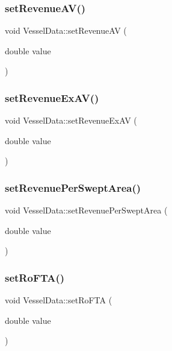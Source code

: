 \subsubsection{\texorpdfstring{setRevenueAV()}{setRevenueAV()}}
{\footnotesize\ttfamily void Vessel\+Data\+::set\+Revenue\+AV (\begin{DoxyParamCaption}\item[{double}]{value }\end{DoxyParamCaption})}

\mbox{\label{class_vessel_data_a3104c210688e4307e32b39b4f31d7a3f}} 
\subsubsection{\texorpdfstring{setRevenueExAV()}{setRevenueExAV()}}
{\footnotesize\ttfamily void Vessel\+Data\+::set\+Revenue\+Ex\+AV (\begin{DoxyParamCaption}\item[{double}]{value }\end{DoxyParamCaption})}

\mbox{\label{class_vessel_data_ad88f8d9af2a0fcedb5a27429a1dfde07}} 
\subsubsection{\texorpdfstring{setRevenuePerSweptArea()}{setRevenuePerSweptArea()}}
{\footnotesize\ttfamily void Vessel\+Data\+::set\+Revenue\+Per\+Swept\+Area (\begin{DoxyParamCaption}\item[{double}]{value }\end{DoxyParamCaption})}

\mbox{\label{class_vessel_data_a0da40a44c39acaedeccaae46bfc59722}} 
\subsubsection{\texorpdfstring{setRoFTA()}{setRoFTA()}}
{\footnotesize\ttfamily void Vessel\+Data\+::set\+Ro\+F\+TA (\begin{DoxyParamCaption}\item[{double}]{value }\end{DoxyParamCaption})}

